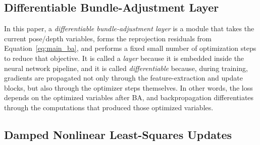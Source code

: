 \documentclass[11pt]{article}
\begin{document}
\subsection{Differentiable Bundle-Adjustment Layer}

In this paper, a \emph{differentiable bundle-adjustment layer} is a module that takes the current pose/depth variables, forms the reprojection residuals from Equation~\eqref{eq:main_ba}, and performs a fixed small number of optimization steps to reduce that objective. It is called a \emph{layer} because it is embedded inside the neural network pipeline, and it is called \emph{differentiable} because, during training, gradients are propagated not only through the feature-extraction and update blocks, but also through the optimizer steps themselves. In other words, the loss depends on the optimized variables after BA, and backpropagation differentiates through the computations that produced those optimized variables.

\subsection{Damped Nonlinear Least-Squares Updates}
\end{document}
